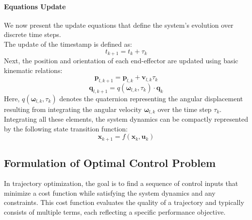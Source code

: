 \documentclass[main.tex]{subfiles}
\begin{document}
\begin{sloppypar}
\paragraph{Equations Update}We now present the update equations that define the system's evolution over discrete time steps. \\ 
The update of the timestamp is defined as:
\begin{equation}
    t_{k+1} = t_k + \tau_k
\end{equation}
Next, the position and orientation of each end-effector are updated using basic kinematic relations:
\begin{equation}
    \mathbf{p}_{l,k+1} = \mathbf{p}_{l,k} + \mathbf{v}_{l,k} \tau_k
\end{equation}
\begin{equation}
    \mathbf{q}_{l,k+1} = \textit{q}(\boldsymbol{\omega}_{l,k}, \tau_k) \cdot \mathbf{q}_{k}
\end{equation}
Here, $\textit{q}(\boldsymbol{\omega}_{l,k}, \tau_k)$ denotes the quaternion representing the angular displacement resulting from integrating the angular velocity $\boldsymbol{\omega}_{l,k}$ over the time step $\tau_k$.
Integrating all these elements, the system dynamics can be compactly represented by the following state transition function:
\begin{equation}
    \mathbf{x}_{k+1} = f(\mathbf{x}_k, \mathbf{u}_k)
\end{equation}
\subsection{Formulation of Optimal Control Problem}
In trajectory optimization, the goal is to find a sequence of control inputs that minimize a cost function while satisfying the system dynamics and any constraints. This cost function evaluates the quality of a trajectory and typically consists of multiple terms, each reflecting a specific performance objective.

\end{sloppypar}
\end{document}
